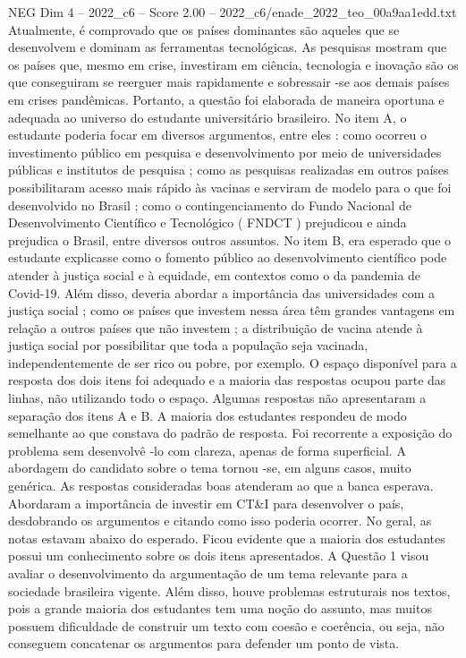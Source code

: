 \begin{textsample}{NEG Dim 4 – 2022\_c6 – Score 2.00 – 2022\_c6/enade\_2022\_teo\_00a9aa1edd.txt}
Atualmente, é comprovado que os países dominantes são aqueles que se desenvolvem e dominam as ferramentas tecnológicas.
As pesquisas mostram que os países que, mesmo em crise, investiram em ciência, tecnologia e inovação são os que conseguiram se reerguer mais rapidamente e sobressair -se aos demais países em crises pandêmicas.
Portanto, a questão foi elaborada de maneira oportuna e adequada ao universo do estudante universitário brasileiro.
No item A, o estudante poderia focar em diversos argumentos, entre eles : como ocorreu o investimento público em pesquisa e desenvolvimento por meio de universidades públicas e institutos de pesquisa ; como as pesquisas realizadas em outros países possibilitaram acesso mais rápido às vacinas e serviram de modelo para o que foi desenvolvido no Brasil ; como o contingenciamento do Fundo Nacional de Desenvolvimento Científico e Tecnológico ( FNDCT ) prejudicou e ainda prejudica o Brasil, entre diversos outros assuntos.
No item B, era esperado que o estudante explicasse como o fomento público ao desenvolvimento científico pode atender à justiça social e à equidade, em contextos como o da pandemia de Covid-19.
Além disso, deveria abordar a importância das universidades com a justiça social ; como os países que investem nessa área têm grandes vantagens em relação a outros países que não investem ; a distribuição de vacina atende à justiça social por possibilitar que toda a população seja vacinada, independentemente de ser rico ou pobre, por exemplo.
O espaço disponível para a resposta dos dois itens foi adequado e a maioria das respostas ocupou parte das linhas, não utilizando todo o espaço.
Algumas respostas não apresentaram a separação dos itens A e B.
A maioria dos estudantes respondeu de modo semelhante ao que constava do padrão de resposta.
Foi recorrente a exposição do problema sem desenvolvê -lo com clareza, apenas de forma superficial.
A abordagem do candidato sobre o tema tornou -se, em alguns casos, muito genérica.
As respostas consideradas boas atenderam ao que a banca esperava.
Abordaram a importância de investir em CT\&I para desenvolver o país, desdobrando os argumentos e citando como isso poderia ocorrer.
No geral, as notas estavam abaixo do esperado.
Ficou evidente que a maioria dos estudantes possui um conhecimento sobre os dois itens apresentados.
A Questão 1 visou avaliar o desenvolvimento da argumentação de um tema relevante para a sociedade brasileira vigente.
Além disso, houve problemas estruturais nos textos, pois a grande maioria dos estudantes tem uma noção do assunto, mas muitos possuem dificuldade de construir um texto com coesão e coerência, ou seja, não conseguem concatenar os argumentos para defender um ponto de vista.

\end{textsample}
